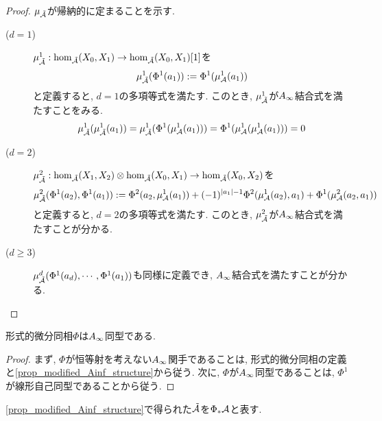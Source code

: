 \documentclass[uplatex, a4paper, 14Q, dvipdfmx]{jsarticle}
\begin{document}
\begin{proof}
  $\mu_{\tilde{\mathcal{A}}}$が帰納的に定まることを示す. 
  \begin{description}
    \item[($d=1$)] $\mu^1_{\tilde{\mathcal{A}}} : \hom_{\tilde{\mathcal{A}}}(X_0,X_1) \to \hom_{\tilde{\mathcal{A}}}(X_0,X_1)[1]$を
    \begin{align*}
      \mu^1_{\tilde{\mathcal{A}}} (\Phi^1(a_1))
      := \Phi^1(\mu^1_{\mathcal{A}}(a_1))
    \end{align*}
    と定義すると, $d=1$の多項等式を満たす.
    このとき, $\mu^1_{\tilde{\mathcal{A}}}$が$A_{\infty}$結合式を満たすことをみる. 
    \begin{align*}
      \mu^1_{\tilde{\mathcal{A}}} (\mu^1_{\tilde{\mathcal{A}}} (a_1))
      = \mu^1_{\tilde{\mathcal{A}}} (\Phi^1(\mu^1_{\mathcal{A}}(a_1))) 
      = \Phi^1(\mu^1_{\mathcal{A}} (\mu^1_{\mathcal{A}} (a_1))) 
      = 0
    \end{align*}
    \item[($d=2$)] $\mu^2_{\tilde{\mathcal{A}}} : \hom_{\tilde{\mathcal{A}}}(X_1,X_2) \otimes \hom_{\tilde{\mathcal{A}}}(X_0,X_1) \to \hom_{\tilde{\mathcal{A}}}(X_0,X_2)$を
    \begin{align*}
      \mu^2_{\tilde{\mathcal{A}}} (\Phi^1(a_2),\Phi^1(a_1)) 
      := \Phi^2(a_2,\mu^1_{\mathcal{A}}(a_1)) + (-1)^{|a_1|-1} \Phi^2(\mu^1_{\mathcal{A}}(a_2),a_1) + \Phi^1(\mu^2_{\mathcal{A}}(a_2,a_1))
    \end{align*}
    と定義すると, $d=2$の多項等式を満たす.
    このとき, $\mu^2_{\tilde{\mathcal{A}}}$が$A_{\infty}$結合式を満たすことが分かる. 
    \item[($d \geq 3$)] $\mu^d_{\tilde{\mathcal{A}}} (\Phi^1(a_d), \cdots, \Phi^1(a_1))$も同様に定義でき, $A_{\infty}$結合式を満たすことが分かる.
  \end{description}
\end{proof}

\begin{corollary} \label{prop_Phi_is_Ainf_functor}
  形式的微分同相$\Phi$は$A_{\infty}$同型である. 
\end{corollary}

\begin{proof}
  まず, $\Phi$が恒等射を考えない$A_{\infty}$関手であることは, 形式的微分同相の定義と\cref{prop_modified_Ainf_structure}から従う. 
  次に, $\Phi$が$A_{\infty}$同型であることは, $\Phi^1$が線形自己同型であることから従う.
\end{proof}


\begin{notation}
  \cref{prop_modified_Ainf_structure}で得られた$\tilde{\mathcal{A}}$を$\Phi_\ast \mathcal{A}$と表す.
\end{notation}
\end{document}
